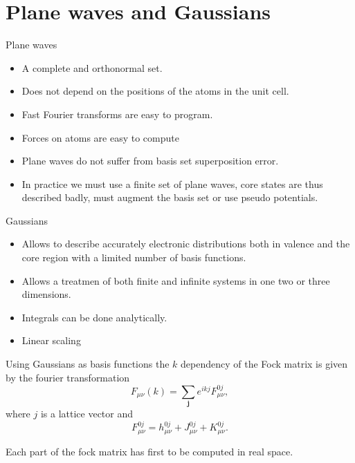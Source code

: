 \documentclass[12pt,a4paper,english]{beamer}
\newcommand{\mbf}{ \mathbf }
\begin{document}
\section{Plane waves and Gaussians}
\begin{frame}
  Plane waves
  \begin{itemize}
	\item A complete and orthonormal set.
	\item Does not depend on the positions of the atoms in the unit cell.
	\item Fast Fourier transforms are easy to program.
	\item Forces on atoms are easy to compute
	\item Plane waves do not suffer from basis set superposition error.
	\item In practice we must use a finite set of plane waves, core states are thus described badly, must augment the basis set or use pseudo potentials.
  \end{itemize}
\end{frame}
\begin{frame}
  Gaussians
  \begin{itemize}
	\item Allows to describe accurately electronic distributions both in valence and the core region with a limited number of basis functions.
	\item Allows a treatmen of both finite and infinite systems in one two or three dimensions.
	\item Integrals can be done analytically.
	\item Linear scaling
  \end{itemize}
\end{frame}

\begin{frame}

  Using Gaussians as basis functions the $k$ dependency of the Fock matrix is given by the fourier transformation
  \begin{equation}
	F_{\mu\nu}(k)=\sum_{\mbf j}e^{ikj}F_{\mu\nu}^{0j},
	   \label{hfbleq:totmatx2}
	 \end{equation}
	 where $j$ is a lattice vector and
	 \begin{equation}
	   F_{\mu\nu}^{0j}=h_{\mu\nu}^{0j}+J_{\mu\nu}^{0j}+K_{\mu\nu}^{0j}.
	 \end{equation}

	 Each part of the fock matrix has first to be computed in real space.

\end{frame}
\end{document}
